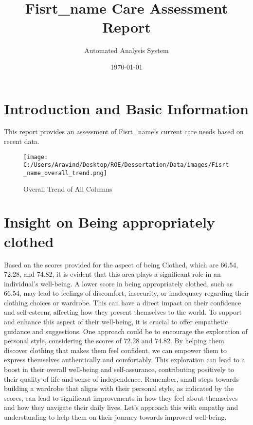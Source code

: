 \documentclass[10pt, a4paper]{article}%
\title{Fisrt\_name Care Assessment Report}%
\author{Automated Analysis System}%
\date{\today}%
\begin{document}
%
\normalsize%
\maketitle%
\section{Introduction and Basic Information}%
\label{sec:IntroductionandBasicInformation}%
This report provides an assessment of Fisrt\_name's current care needs based on recent data.%


\begin{figure}[H]%
\centering%
\texttt{[image: C:/Users/Aravind/Desktop/ROE/Dessertation/Data/images/Fisrt\_name\_overall\_trend.png]}%
\caption{Overall Trend of All Columns}%
\end{figure}

%
\section{Insight on Being appropriately clothed}%
\label{sec:InsightonBeingappropriatelyclothed}%
Based on the scores provided for the aspect of being Clothed, which are 66.54, 72.28, and 74.82, it is evident that this area plays a significant role in an individual's well{-}being. A lower score in being appropriately clothed, such as 66.54, may lead to feelings of discomfort, insecurity, or inadequacy regarding their clothing choices or wardrobe. This can have a direct impact on their confidence and self{-}esteem, affecting how they present themselves to the world.\newline%
\newline%
To support and enhance this aspect of their well{-}being, it is crucial to offer empathetic guidance and suggestions. One approach could be to encourage the exploration of personal style, considering the scores of 72.28 and 74.82. By helping them discover clothing that makes them feel confident, we can empower them to express themselves authentically and comfortably. This exploration can lead to a boost in their overall well{-}being and self{-}assurance, contributing positively to their quality of life and sense of independence.\newline%
\newline%
Remember, small steps towards building a wardrobe that aligns with their personal style, as indicated by the scores, can lead to significant improvements in how they feel about themselves and how they navigate their daily lives. Let's approach this with empathy and understanding to help them on their journey towards improved well{-}being.%
\end{document}
